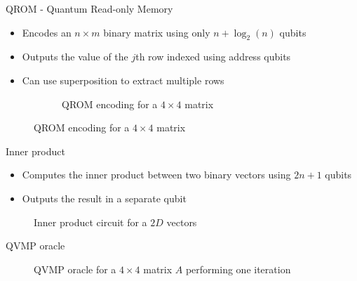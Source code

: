 \documentclass[10pt]{beamer}
\begin{document}
\begin{frame}{QROM - Quantum Read-only Memory}
  \begin{itemize}
    \item Encodes an $n \times m$ binary matrix using only $n + \log_2(n)$ qubits
    \item Outputs the value of the $j$th row indexed using address qubits
    \item Can use superposition to extract multiple rows
  \end{itemize}
  \begin{figure}
      \centering
      \begin{subfigure}{\textwidth}
        \centering
        
        \caption{QROM encoding for a $4 \times 4$ matrix}
      \end{subfigure}
      \label{fig:qrom_4x4}
  \end{figure}
\end{frame}

\begin{frame}{Inner product}
  \begin{itemize}
    \item Computes the inner product between two binary vectors using $2n + 1$
      qubits
    \item Outputs the result in a separate qubit
  \end{itemize}
  \begin{figure}
    \centering
    
    \caption{Inner product circuit for a $2D$ vectors}
    \label{fig:inner_product}
  \end{figure}
\end{frame}

\begin{frame}{QVMP oracle}
  \begin{figure}
    \centering
    \scalebox{0.7}{}
    \caption{QVMP oracle for a $4 \times 4$ matrix $A$ performing one iteration}
    \label{fig:qvmp_oracle}
  \end{figure}
\end{frame}
\end{document}
